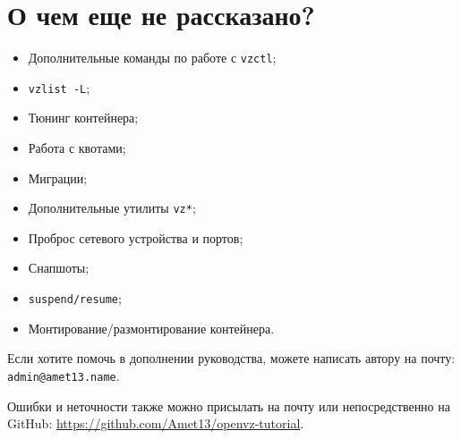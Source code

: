 \section{О чем еще не рассказано?}

\begin{itemize}
    \item Дополнительные команды по работе с \texttt{vzctl};
    \item \texttt{vzlist -L};
    \item Тюнинг контейнера;
    \item Работа с квотами;
    \item Миграции;
    \item Дополнительные утилиты \texttt{vz*};
    \item Проброс сетевого устройства и портов;
    \item Снапшоты;
    \item \texttt{suspend/resume};
    \item Монтирование/размонтирование контейнера.
\end{itemize}

Если хотите помочь в дополнении руководства, можете написать автору на почту: \texttt{admin@amet13.name}.

Ошибки и неточности также можно присылать на почту или непосредственно на GitHub: \url{https://github.com/Amet13/openvz-tutorial}.

\clearpage
